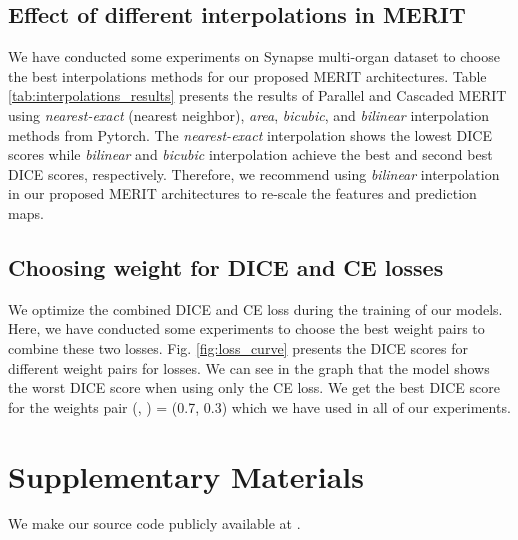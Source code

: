 \documentclass{midl}
\begin{document}
\subsection{Effect of different interpolations in MERIT}
\label{assec:effect_interpolations}
We have conducted some experiments on Synapse multi-organ dataset to choose the best interpolations methods for our proposed MERIT architectures. Table \ref{tab:interpolations_results} presents the results of Parallel and Cascaded MERIT using \textit{nearest-exact} (nearest neighbor), \textit{area}, \textit{bicubic}, and \textit{bilinear} interpolation methods from Pytorch. The \textit{nearest-exact} interpolation shows the lowest DICE scores while \textit{bilinear} and \textit{bicubic} interpolation achieve the best and second best DICE scores, respectively. Therefore, we recommend using \textit{bilinear} interpolation in our proposed MERIT architectures to re-scale the features and prediction maps. 

\subsection{Choosing weight for DICE and CE losses}
\label{assec:loss_weight}
We optimize the combined DICE and CE loss during the training of our models. Here, we have conducted some experiments to choose the best weight pairs to combine these two losses. Fig. \ref{fig:loss_curve} presents the DICE scores for different weight pairs for losses. We can see in the graph that the model shows the worst DICE score when using only the CE loss. We get the best DICE score for the weights pair (, ) = (0.7, 0.3) which we have used in all of our experiments.   



\section{Supplementary Materials}
We make our source code publicly available at .
\end{document}
